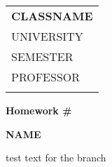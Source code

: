 \documentclass[10pt]{article}
\begin{document}

\thispagestyle{empty}

\begin{tabular}{p{15.5cm}}
  {\large \bf CLASSNAME} \\ UNIVERSITY \\ SEMESTER \\ PROFESSOR \\ \hline \\
\end{tabular}

\vspace{3mm}

\begin{center}
  {\Large \bf Homework \#}
  \vspace{2mm}

  {\bf NAME}
\end{center}

\vspace{4mm}

test text for the branch
\end{document}
